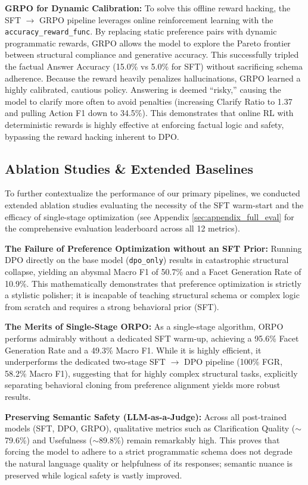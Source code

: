 \documentclass{article}
\theoremstyle{plain}
\theoremstyle{definition}
\theoremstyle{remark}
\begin{document}
\textbf{GRPO for Dynamic Calibration:} To solve this offline reward hacking, the SFT $\rightarrow$ GRPO pipeline leverages online reinforcement learning with the \texttt{accuracy\_reward\_func}. By replacing static preference pairs with dynamic programmatic rewards, GRPO allows the model to explore the Pareto frontier between structural compliance and generative accuracy. This successfully tripled the factual Answer Accuracy (15.0\% vs 5.0\% for SFT) without sacrificing schema adherence. Because the reward heavily penalizes hallucinations, GRPO learned a highly calibrated, cautious policy. Answering is deemed ``risky,'' causing the model to clarify more often to avoid penalties (increasing Clarify Ratio to 1.37 and pulling Action F1 down to 34.5\%). This demonstrates that online RL with deterministic rewards is highly effective at enforcing factual logic and safety, bypassing the reward hacking inherent to DPO.

\subsection{Ablation Studies \& Extended Baselines}
To further contextualize the performance of our primary pipelines, we conducted extended ablation studies evaluating the necessity of the SFT warm-start and the efficacy of single-stage optimization (see Appendix \ref{sec:appendix_full_eval} for the comprehensive evaluation leaderboard across all 12 metrics).

\textbf{The Failure of Preference Optimization without an SFT Prior:}
Running DPO directly on the base model (\texttt{dpo\_only}) results in catastrophic structural collapse, yielding an abysmal Macro F1 of 50.7\% and a Facet Generation Rate of 10.9\%. This mathematically demonstrates that preference optimization is strictly a stylistic polisher; it is incapable of teaching structural schema or complex logic from scratch and requires a strong behavioral prior (SFT).

\textbf{The Merits of Single-Stage ORPO:}
As a single-stage algorithm, ORPO performs admirably without a dedicated SFT warm-up, achieving a 95.6\% Facet Generation Rate and a 49.3\% Macro F1. While it is highly efficient, it underperforms the dedicated two-stage SFT $\rightarrow$ DPO pipeline (100\% FGR, 58.2\% Macro F1), suggesting that for highly complex structural tasks, explicitly separating behavioral cloning from preference alignment yields more robust results.

\textbf{Preserving Semantic Safety (LLM-as-a-Judge):}
Across all post-trained models (SFT, DPO, GRPO), qualitative metrics such as Clarification Quality ($\sim$79.6\%) and Usefulness ($\sim$89.8\%) remain remarkably high. This proves that forcing the model to adhere to a strict programmatic schema does not degrade the natural language quality or helpfulness of its responses; semantic nuance is preserved while logical safety is vastly improved.
\end{document}

